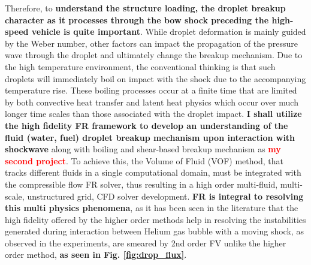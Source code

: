 \documentclass[11pt,sans]{wlscirep} %
\begin{document}
\noindent Therefore, to \textbf{understand the structure loading, the droplet breakup character as it processes through the bow shock preceding the high-speed vehicle is quite important}. While droplet deformation is mainly guided by the Weber number, other factors can impact the propagation of the pressure wave through the droplet and ultimately change the breakup mechanism\cite{kondo2019simulation}. Due to the high temperature environment, the conventional thinking is that such droplets will immediately boil on impact with the shock due to the accompanying temperature rise. These boiling processes occur at a finite time that are limited by both convective heat transfer and latent heat physics which occur over much longer time scales than those associated with the droplet impact\cite{esplin2021measurement}. \textbf{I shall utilize the high fidelity FR framework to develop an understanding of the fluid (water, fuel) droplet breakup mechanism upon interaction with shockwave} along with boiling and shear-based breakup mechanism as \textcolor{red}{\textbf{my second project}}. To achieve this, the Volume of Fluid (VOF) method, that tracks different fluids in a single computational domain, must be integrated with the compressible flow FR solver, thus resulting in a high order multi-fluid, multi-scale, unstructured grid, CFD solver development. \textbf{FR is integral to resolving this multi physics phenomena}, as it has been seen in the literature\cite{peyvan2022oscillation} that the high fidelity offered by the higher order methods help in resolving the instabilities generated during interaction between Helium gas bubble with a moving shock, as observed in the experiments, are smeared by 2nd order FV unlike the higher order method, \textbf{as seen in Fig. \ref{fig:drop_flux}}.  %
\end{document}
